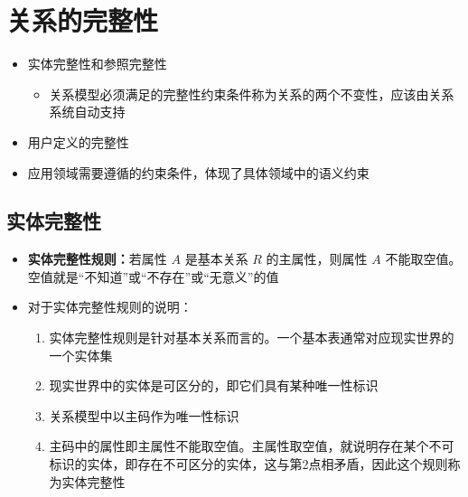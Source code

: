 \section{关系的完整性}
\begin{itemize}
    \item 实体完整性和参照完整性
    \begin{itemize}
        \item 关系模型必须满足的完整性约束条件称为关系的两个不变性，应该由关系系统自动支持
    \end{itemize}
    \item 用户定义的完整性
    \item 应用领域需要遵循的约束条件，体现了具体领域中的语义约束
\end{itemize}

\subsection{实体完整性}
\begin{itemize}
    \item \textbf{实体完整性规则：}若属性 $A$ 是基本关系 $R$ 的主属性，则属性 $A$ 不能取空值。空值就是“不知道”或“不存在”或“无意义”的值
    \item 对于实体完整性规则的说明：
    \begin{enumerate}[label=\arabic*.]
        \item 实体完整性规则是针对基本关系而言的。一个基本表通常对应现实世界的一个实体集
        \item 现实世界中的实体是可区分的，即它们具有某种唯一性标识
        \item 关系模型中以主码作为唯一性标识
        \item 主码中的属性即主属性不能取空值。主属性取空值，就说明存在某个不可标识的实体，即存在不可区分的实体，这与第2点相矛盾，因此这个规则称为实体完整性
    \end{enumerate}
\end{itemize}

